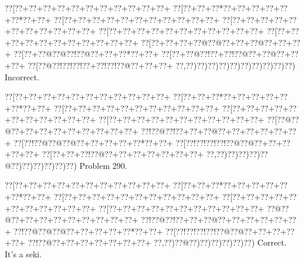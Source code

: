 \documentclass[a5paper]{article}
\begin{document}
\begin{center}
{\goo
\0??[\0??+\0??+\0??+\0??+\0??+\0??+\0??+\0??+\0??+\0??+\0??+
\0??[\0??+\0??+\0??*\0??+\0??+\0??+\0??+\0??+\0??*\0??+\0??+
\0??[\0??+\0??+\0??+\0??+\0??+\0??+\0??+\0??+\0??+\0??+\0??+
\0??[\0??+\0??+\0??+\0??+\0??+\0??+\0??+\0??+\0??+\0??+\0??+
\0??[\0??+\0??+\0??+\0??+\0??+\0??+\0??+\0??+\0??+\0??+\0??+
\0??[\0??+\0??+\0??+\0??+\0??+\0??+\0??+\0??+\0??+\0??+\0??+
\0??[\0??+\0??+\0??+\0??@\0??@\0??+\0??+\0??@\0??+\0??+\0??+
\0??[\0??+\0??@\0??@\0??!\0??@\0??+\0??+\0??*\0??+\0??+
\0??[\0??+\0??@\0??!\0??+\0??!\0??@\0??+\0??@\0??+\0??+\0??+
\0??[\0??@\0??!\0??!\0??!\0??+\0??!\0??!\0??@\0??+\0??+\0??+
\0??,\0??)\0??)\0??)\0??)\0??)\0??)\0??)\0??)\0??)\0??)
}
Incorrect. 

\end{center}
\newpage
\begin{center}
{\goo
\0??[\0??+\0??+\0??+\0??+\0??+\0??+\0??+\0??+\0??+\0??+\0??+
\0??[\0??+\0??+\0??*\0??+\0??+\0??+\0??+\0??+\0??*\0??+\0??+
\0??[\0??+\0??+\0??+\0??+\0??+\0??+\0??+\0??+\0??+\0??+\0??+
\0??[\0??+\0??+\0??+\0??+\0??+\0??+\0??+\0??+\0??+\0??+\0??+
\0??[\0??+\0??+\0??+\0??+\0??+\0??+\0??+\0??+\0??+\0??+\0??+
\0??[\0??@\0??@\0??+\0??+\0??+\0??+\0??+\0??+\0??+\0??+\0??+
\0??!\0??@\0??!\0??+\0??+\0??@\0??+\0??+\0??+\0??+\0??+\0??+
\0??[\0??!\0??@\0??@\0??@\0??+\0??+\0??+\0??+\0??*\0??+\0??+
\0??[\0??!\0??!\0??!\0??!\0??@\0??@\0??+\0??+\0??+\0??+\0??+
\0??[\0??+\0??+\0??!\0??@\0??+\0??+\0??+\0??+\0??+\0??+\0??+
\0??,\0??)\0??)\0??)\0??)\0??@\0??)\0??)\0??)\0??)\0??)\0??)
}
Problem 290.

\end{center}
\begin{center}
{\goo
\0??[\0??+\0??+\0??+\0??+\0??+\0??+\0??+\0??+\0??+\0??+\0??+
\0??[\0??+\0??+\0??*\0??+\0??+\0??+\0??+\0??+\0??*\0??+\0??+
\0??[\0??+\0??+\0??+\0??+\0??+\0??+\0??+\0??+\0??+\0??+\0??+
\0??[\0??+\0??+\0??+\0??+\0??+\0??+\0??+\0??+\0??+\0??+\0??+
\0??[\0??+\0??+\0??+\0??+\0??+\0??+\0??+\0??+\0??+\0??+\0??+
\0??@\0??@\0??+\0??+\0??+\0??+\0??+\0??+\0??+\0??+\0??+
\0??!\0??@\0??!\0??+\0??+\0??@\0??+\0??+\0??+\0??+\0??+\0??+
\0??!\0??@\0??@\0??@\0??+\0??+\0??+\0??+\0??*\0??+\0??+
\0??[\0??!\0??!\0??!\0??!\0??@\0??@\0??+\0??+\0??+\0??+\0??+
\0??!\0??@\0??+\0??+\0??+\0??+\0??+\0??+\0??+
\0??,\0??)\0??@\0??)\0??)\0??)\0??)\0??)\0??)
}
Correct. It's a seki.

\end{center}
\end{document}
